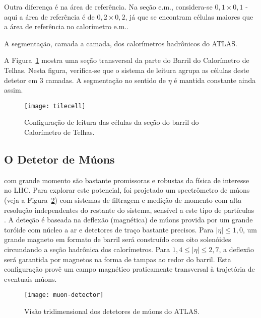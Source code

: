 Outra diferença é na área de referência. Na seção e.m., considera-se
$0,1\times0,1$ - aqui a área de referência é de $0,2\times0,2$, já que se
encontram células maiores que a área de referência no calorímetro e.m..

\begin{table}
\caption{A segmentação, camada a camada, dos calo\-rí\-metros ha\-drô\-nicos
do ATLAS.}
\label{tab:had}
\begin{center}

\end{center}
\end{table}

A Figura~\ref{fig:tilecell} mostra uma seção transversal da parte do Barril do
Calorímetro de Telhas. Nesta figura, verifica-se que o sistema de leitura
agrupa as células deste detetor em 3 camadas. A segmentação no sentido de
$\eta$ é mantida constante ainda assim.

\begin{figure}
\begin{center}
\texttt{[image: tilecell]}
\end{center}
\caption{Configuração de leitura das células da seção do barril do Calorímetro
de Telhas.}
\label{fig:tilecell}
\end{figure}

\subsection{O Detetor de Múons}
\label{sec:atlas-muon}

 com grande momento são  bastante
promissoras e robustas da física de interesse no LHC. Para explorar este
potencial, foi projetado um spectrômetro de múons (veja a
Figura~\ref{fig:atlas-muon-3d}) com sistemas de filtragem e medição de momento
com alta resolução independentes do restante do sistema, sensível a este tipo
de partículas \cite{atlas-mu-tdr}. A deteção é baseada na deflexão (magnética)
de múons provida por um grande toróide com núcleo a ar e detetores de traço
bastante precisos. Para $|\eta| \leq 1,0$, um grande magneto em formato de
barril será construído com oito solenóides circundando a seção hadrônica dos
calorímetros. Para $1,4 \leq |\eta| \leq 2,7$, a deflexão será garantida por
magnetos na forma de tampas ao redor do barril. Esta configuração provê um
campo magnético praticamente transversal à trajetória de eventuais múons.

\begin{figure}
\begin{center}
\texttt{[image: muon-detector]}
\end{center}
\caption{Visão tridimensional dos detetores de múons do ATLAS.}
\label{fig:atlas-muon-3d}
\end{figure}

